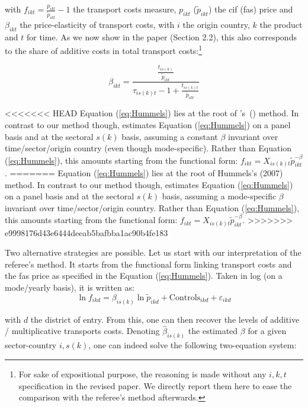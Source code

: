 \documentclass[a4paper,11pt]{article}
\newcommand\cites[1]{\citeauthor{#1}'s\ (\citeyear{#1})}
\begin{document}
\begin{itemize}
     with $f_{ikt} = \frac{p_{ikt}}{\widetilde{p}_{ikt}} -1 $ the transport costs measure, $p_{ikt}$ ($\widetilde{p}_{ikt}$) the cif (fas) price and $\beta_{ikt}$ the price-elasticity of transport costs, with $i$ the origin country, $k$ the product and $t$ for time. As we now show in the paper (Section 2.2), this also corresponds to the share of additive costs in total transport costs:\footnote{For sake of expositional purpose, the reasoning is made without any $i,k,t$ specification in the revised paper. We directly report them here to ease the comparison with the referee's method afterwards.}

     \begin{equation}
     \beta_{ikt} = \frac{\frac{t_{is(k)}}{\widetilde{p}_{ikt}}}{\tau_{is(k)t}-1+\frac{t_{is(k)t}}{\widetilde{p}_{ikt}} } \label{eq:beta_TC}
     \end{equation}

<<<<<<< HEAD
     Equation (\ref{eq:Hummels}) lies at the root of \cites{hummels2007} method. In contrast to our method though, \cite{hummels2007} estimates Equation (\ref{eq:Hummels}) on a panel basis and at the sectoral $s(k)$ basis, assuming a constant $\beta$ invariant over time/sector/origin country (even though mode-specific). Rather than Equation (\ref{eq:Hummels}), this amounts starting from the functional form: $f_{ikt} = X_{is(k)t}\widetilde{p}_{ikt}^{-\beta}$.
=======
     Equation (\ref{eq:Hummels}) lies at the root of Hummels's (2007) method. In contrast to our method though, \cite{hummels2007} estimates Equation (\ref{eq:Hummels}) on a panel basis and at the sectoral $s(k)$ basis, assuming a mode-specific $\beta$ invariant over time/sector/origin country. Rather than Equation (\ref{eq:Hummels}), this amounts starting from the functional form: $f_{ikt} = X_{is(k)t}\widetilde{p}_{ikt}^{-\beta}$.
>>>>>>> e9998176d43e6444deeab5bafbba1ac90b4fe183

     Two alternative strategies are possible. Let us start with our interpretation of the referee's method. It starts from the functional form linking transport costs and the fas price as specified in the Equation (\ref{eq:Hummels}). Taken in log (on a mode/yearly basis), it is written as:
     $$\ln f_{ikd} = \beta_{is(k)}\ln \widetilde{p}_{ikd} +\text{Controls}_{ikd}+ \varepsilon_{ikd}$$

     \noindent with $d$ the district of entry. From this, one can then recover the levels of additive / multiplicative transports costs. Denoting $\widehat{\beta}_{is(k)}$ the estimated $\beta$ for a given sector-country $i,s(k)$, one can indeed solve the following two-equation system:


\end{itemize}
\end{document}
